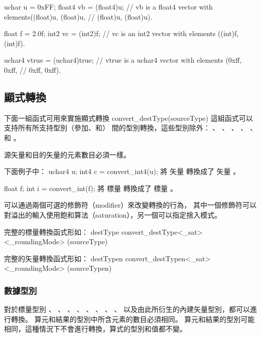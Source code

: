 uchar	u = 0xFF;
float4	vb = (float4)u;
// vb is a float4 vector with elements((float)u, (float)u,
//                                     (float)u, (float)u).

float	f = 2.0f;
int2	vc = (int2)f;
// vc is an int2 vector with elements ((int)f, (int)f).

uchar4	vtrue = (uchar4)true;
// vtrue is a uchar4 vector with elements (0xff, 0xff,
//                                         0xff, 0xff).
\stopclc

\subsection[sec:explicitConversion]{顯式轉換}

下面一組函式可用來實施顯式轉換
\startclc
convert_destType(sourceType)
\stopclc
這組函式可以支持所有所支持型別（參加、和）
間的型別轉換，這些型別除外：
 、 、 、 、
 、  和 。

源矢量和目的矢量的元素數目必須一樣。

下面例子中：
\startclc
uchar4	u;
int4	c = convert_int4(u);
\stopclc
{}
 將  矢量  轉換成了  矢量 。

\startclc
float	f;
int	i = convert_int(f);
\stopclc
{}
 將  標量  轉換成了  標量 。

可以通過兩個可選的修飾符（modifier）來改變轉換的行為，
其中一個修飾符可以對溢出的輸入使用飽和算法（saturation），另一個可以指定捨入模式。

完整的標量轉換函式形如：
\startclc
destType convert_destType<_sat><_roundingMode> (sourceType)
\stopclc

完整的矢量轉換函式形如：
\startclc
destTypen convert_destTypen<_sat><_roundingMode> (sourceTypen)
\stopclc

\subsubsection{數據型別}

對於標量型別 、 、 、 、
 、 、 、 、 
 以及由此所衍生的內建矢量型別，都可以進行轉換。
算元和結果的型別中所含元素的數目必須相同。
算元和結果的型別可能相同，這種情況下不會進行轉換，算式的型別和值都不變。

